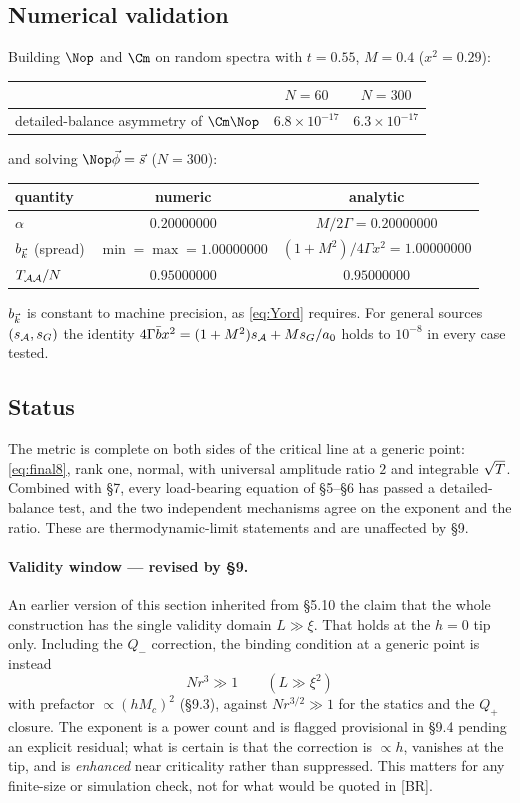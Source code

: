 \subsection{Numerical validation}
Building $\Nop$ and $\Cm$ on random spectra with $t=0.55$, $M=0.4$ ($x^{2}=0.29$):
\begin{center}
\begin{tabular}{lcc}
\hline
 & $N=60$ & $N=300$\\
\hline
detailed-balance asymmetry of $\Cm\Nop$ & $6.8\times10^{-17}$ & $6.3\times10^{-17}$\\
\hline
\end{tabular}
\end{center}
and solving $\Nop\vec\phi=\vec s$ ($N=300$):
\begin{center}
\begin{tabular}{lcc}
\hline
quantity & numeric & analytic\\
\hline
$\alpha$ & $0.20000000$ & $M/2\Gamma=0.20000000$\\
$b_{\vec k}$ (spread) & $\min=\max=1.00000000$ & $(1+M^{2})/4\Gamma x^{2}=1.00000000$\\
$T_{\mathcal{A}\mathcal{A}}/N$ & $0.95000000$ & $0.95000000$\\
\hline
\end{tabular}
\end{center}
$b_{\vec k}$ is constant to machine precision, as \eqref{eq:Yord} requires. For general sources
$(s_{\mathcal{A}},s_G)$ the identity $4\Gamma\bar bx^{2}=(1+M^{2})s_{\mathcal{A}}+Ms_G/a_0$ holds to
$10^{-8}$ in every case tested.

\subsection{Status}
\label{sec:status8}
The metric is complete on both sides of the critical line at a generic point:
\eqref{eq:final8}, rank one, normal, with universal amplitude ratio $2$ and integrable
$\sqrt{T}$. Combined with \S7, every load-bearing equation of \S5--\S6 has passed a
detailed-balance test, and the two independent mechanisms agree on the exponent and the
ratio. These are thermodynamic-limit statements and are unaffected by \S9.

\paragraph{Validity window --- revised by \S9.}
An earlier version of this section inherited from \S5.10 the claim that the whole
construction has the single validity domain $L\gg\xi$. That holds at the $h=0$ tip only.
Including the $Q_-$ correction, the binding condition at a generic point is instead
\begin{equation}
  \boxed{\ N r^{3}\gg1\qquad(L\gg\xi^{2})\ }
\end{equation}
with prefactor $\propto(hM_c)^{2}$ (\S9.3), against $Nr^{3/2}\gg1$ for the statics and the
$Q_+$ closure. The exponent is a power count and is flagged provisional in \S9.4 pending an
explicit residual; what is certain is that the correction is $\propto h$, vanishes at the
tip, and is \emph{enhanced} near criticality rather than suppressed. This matters for any
finite-size or simulation check, not for what would be quoted in [BR].

